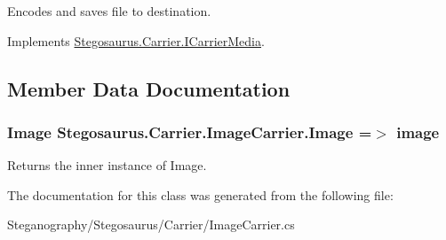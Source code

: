 Encodes and saves file to destination. 



Implements \hyperlink{interface_stegosaurus_1_1_carrier_1_1_i_carrier_media_a419a6ed82dc1053f25e42a26e2fbade3}{Stegosaurus.\+Carrier.\+I\+Carrier\+Media}.



\subsection{Member Data Documentation}
\subsubsection[{\texorpdfstring{Image}{Image}}]{\setlength{\rightskip}{0pt plus 5cm}Image Stegosaurus.\+Carrier.\+Image\+Carrier.\+Image =$>$ image}\hypertarget{class_stegosaurus_1_1_carrier_1_1_image_carrier_a75c34608afe89054cf1de0729d37f5ac}{}\label{class_stegosaurus_1_1_carrier_1_1_image_carrier_a75c34608afe89054cf1de0729d37f5ac}


Returns the inner instance of Image. 



The documentation for this class was generated from the following file\+:\begin{DoxyCompactItemize}
\item 
Steganography/\+Stegosaurus/\+Carrier/Image\+Carrier.\+cs\end{DoxyCompactItemize}
